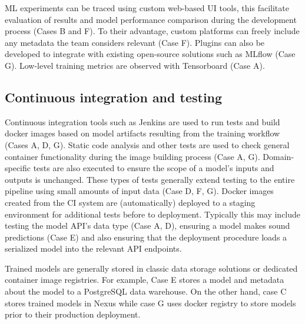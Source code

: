 
 
ML experiments can be traced using custom web-based UI tools, this facilitate evaluation of results and model performance comparison during the development process (Cases B and F). To their advantage, custom platforms can freely include any metadata the team considers relevant (Case F). Plugins can also be developed to integrate with existing open-source solutions such as MLflow (Case G). Low-level training metrics are observed with Tensorboard (Case A).

\subsection{Continuous integration and testing}

Continuous integration tools such as Jenkins are used to run tests and build docker images based on model artifacts resulting from the training workflow (Cases A, D, G). Static code analysis and other tests are used to check general container functionality during the image building process (Case A, G). Domain-specific tests are also executed to ensure the scope of a model's inputs and outputs is unchanged. These types of tests generally extend testing to the entire pipeline using small amounts of input data (Case D, F, G). Docker images created from the CI system are (automatically) deployed to a staging environment for additional tests before to deployment. %
Typically this may include testing the model API's data type (Case A, D), ensuring a model makes sound predictions (Case E) and also ensuring that the deployment procedure loads a serialized model into the relevant API endpoints.

Trained models are generally stored in classic data storage solutions or dedicated container image registries. For example, Case E stores a model and metadata about the model to a PostgreSQL data warehouse. On the other hand, case C stores trained models in Nexus while case G uses docker registry to store models prior to their production deployment.


